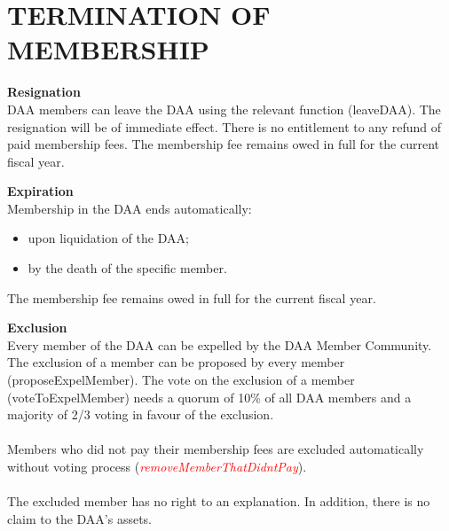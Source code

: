\section{TERMINATION OF MEMBERSHIP}

\item \textbf{Resignation} \\
DAA members can leave the DAA using the relevant function (leaveDAA).
The resignation will be of immediate effect.
There is no entitlement to any refund of paid membership fees.
The membership fee remains owed in full for the current fiscal year.

\item \textbf{Expiration} \\
Membership in the DAA ends automatically:
\begin{itemize}
    \item upon liquidation of the DAA;
    \item by the death of the specific member.
\end{itemize}
The membership fee remains owed in full for the current fiscal year.

\item \textbf{Exclusion} \\
Every member of the DAA can be expelled by the DAA Member Community.
The exclusion of a member can be proposed by every member (proposeExpelMember). %
The vote on the exclusion of a member (voteToExpelMember) needs a quorum of 10\% of all DAA members and a majority of 2/3 voting in favour of the exclusion. \\ \\
Members who did not pay their membership fees are excluded automatically without voting process (\textcolor{red}{\emph{removeMemberThatDidntPay}}). \\ \\ %
The excluded member has no right to an explanation.
In addition, there is no claim to the DAA’s assets.
